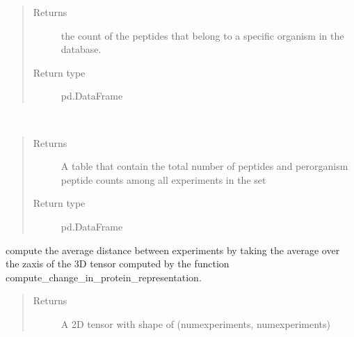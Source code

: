 \documentclass[letterpaper,10pt,english]{sphinxmanual}
\begin{document}
\begin{fulllineitems}
\begin{fulllineitems}
\begin{quote}
\begin{description}
\begin{itemize}
\end{itemize}

\item[{Returns}] \leavevmode
the count of the peptides that belong to a specific organism in the database.

\item[{Return type}] \leavevmode
pd.DataFrame

\end{description}\end{quote}

\end{fulllineitems}


\begin{fulllineitems}
\label{\detokenize{IPTK.Classes:IPTK.Classes.ExperimentalSet.ExperimentSet.compare_peptide_counts}}~\begin{quote}\begin{description}
\item[{Returns}] \leavevmode
A table that contain the total number of peptides and per\sphinxhyphen{}organism peptide counts         among all experiments in the set

\item[{Return type}] \leavevmode
pd.DataFrame

\end{description}\end{quote}

\end{fulllineitems}


\begin{fulllineitems}
\label{\detokenize{IPTK.Classes:IPTK.Classes.ExperimentalSet.ExperimentSet.compute_average_distance_between_exps}}
compute the average distance between experiments by taking the average over the z\sphinxhyphen{}axis
of the 3D tensor computed by the function compute\_change\_in\_protein\_representation.
\begin{quote}\begin{description}
\item[{Returns}] \leavevmode
A 2D tensor with shape of (num\sphinxhyphen{}experiments, num\sphinxhyphen{}experiments)


\end{description}
\end{quote}
\end{fulllineitems}
\end{fulllineitems}
\end{document}
